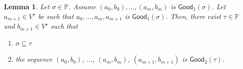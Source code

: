 \documentclass[10pt,a4paper, openany,  oldfontcommands]{memoir}
\newtheorem{lemma} [theorem] {Lemma}
\newtheorem{open problem} [theorem] {Open Problem}
\begin{document}
 
 
 
 
 
 
 
 
 












\begin{lemma}  \label{SectionWDExtensionLemma}
Let  $  \sigma  \in  \mathbb{P} $. 
Assume   $  \left( a_0, b_0  \right),    \ldots , \left( a_m, b_m  \right) $     is  $ \mathsf{Good}_2 \left(   \sigma  \right)    $. 
Let    $  a_{ m+1 }   \in  V^{  \star }  $ be such that   $ a_0,  \ldots , a_m , a_{ m+1 } $  is   $ \mathsf{Good}_1 \left(   \sigma   \right)   $. 
Then, there exist  $  \tau \in  \mathbb{P}  $  and  $  b_{ m+1}  \in  V^{  \star }  $  such that  
\begin{enumerate}
\item   $  \sigma  \subseteq  \tau  $   


\item  the  sequence 
 $  \left( a_0, b_0  \right) $, $     \ldots  $,    $  \left( a_m, b_m  \right)   $,      $    \left( a_{ m+1 } , b_{ m+1}   \right) $    
  is  $  \mathsf{Good}_2  \left(   \tau  \right)   $. 
\end{enumerate}
\end{lemma}
\end{document}
